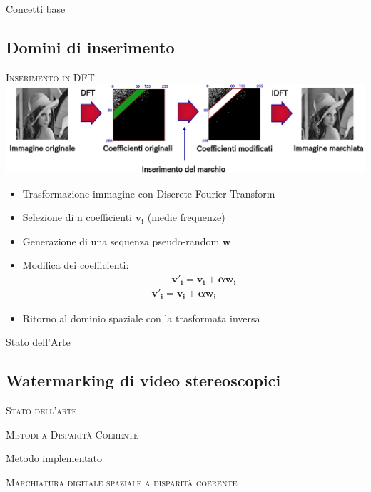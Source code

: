\documentclass{beamer}
\begin{document}
\begin{section}{Concetti base}
\subsection{Domini di inserimento}
\begin{frame}[t]{\textsc{Inserimento in DFT}}
\centering
\includegraphics[width=1\linewidth]{./img/dft.png}
\begin{itemize}
\item Trasformazione immagine con Discrete Fourier Transform
\item Selezione di n coefficienti $\mathbf{v_i}$ (medie frequenze)
\item Generazione di una sequenza pseudo-random $\mathbf{w}$
\item Modifica dei coefficienti: 
\vspace{-2.3em}
 \begin{align*} 
\qquad \mathbf{v'_{i} = v_i + \alpha w_{i}}\\
\mathbf{v'_{i} = v_i + \alpha w_{i}}
\end{align*}
\vspace{-2.5em}
\item Ritorno al dominio spaziale con la trasformata inversa
\end{itemize}

\end{frame}





\end{section}
\begin{section}{Stato dell'Arte}
\subsection{Watermarking di video stereoscopici}
\begin{frame}[t]{\textsc{Stato dell'arte}}

\end{frame}

\begin{frame}[t]{\textsc{Metodi a Disparit\`{a} Coerente}}
\end{frame}

\end{section}

\begin{section}{Metodo implementato}
\begin{frame}[t]{\textsc{Marchiatura digitale spaziale a disparit\`{a} coerente}}

\end{frame}
\end{section}
\end{document}
